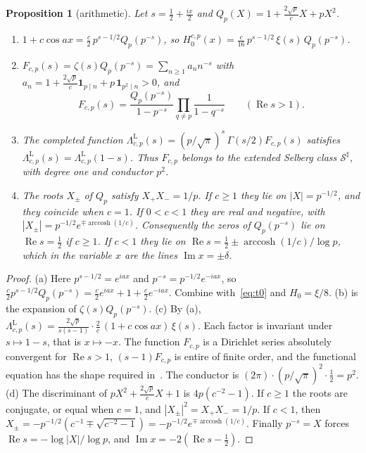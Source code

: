 \documentclass[11pt]{article}
\numberwithin{equation}{section}
\newtheorem{proposition}[theorem]{Proposition}
\theoremstyle{definition}
\theoremstyle{remark}
\DeclareMathOperator{\Rea}{Re}
\DeclareMathOperator{\Ima}{Im}
\DeclareMathOperator{\arccosh}{arccosh}
\newcommand{\Sh}{\mathcal S^\sharp}
\begin{document}
\begin{proposition}[arithmetic]\label{prop:arith}
Let $s=\tfrac12+\tfrac{ix}2$ and $Q_p(X)=1+\tfrac{2\sqrt p}{c}X+pX^2$.
\begin{enumerate}[label=\textup{(\alph*)}]
\item $1+c\cos ax=\tfrac c2\,p^{s-1/2}Q_p(p^{-s})$, so
$H^{c,p}_0(x)=\tfrac c{16}\,p^{s-1/2}\,\xi(s)\,Q_p(p^{-s})$.
\item $F_{c,p}(s)=\zeta(s)Q_p(p^{-s})=\sum_{n\ge1}a_nn^{-s}$ with
$a_n=1+\tfrac{2\sqrt p}c\mathbf 1_{p\mid n}+p\,\mathbf 1_{p^2\mid n}>0$,
and
\[
F_{c,p}(s)=\frac{Q_p(p^{-s})}{1-p^{-s}}\prod_{q\ne p}\frac1{1-q^{-s}}
\qquad(\Rea s>1).
\]
\item The completed function $\Lambda_{c,p}^{\mathrm{L}}(s)=(p/\sqrt\pi)^s\,
\Gamma(s/2)F_{c,p}(s)$ satisfies
$\Lambda^{\mathrm L}_{c,p}(s)=\Lambda^{\mathrm L}_{c,p}(1-s)$. Thus
$F_{c,p}$ belongs to the extended Selberg class $\Sh$, with degree one and
conductor $p^2$.
\item The roots $X_\pm$ of $Q_p$ satisfy $X_+X_-=1/p$. If $c\ge1$ they lie on
$|X|=p^{-1/2}$, and they coincide when $c=1$. If $0<c<1$ they are real and
negative, with $|X_\pm|=p^{-1/2}e^{\mp\arccosh(1/c)}$. Consequently the zeros
of $Q_p(p^{-s})$ lie on $\Rea s=\tfrac12$ if $c\ge1$. If $c<1$ they lie on
$\Rea s=\tfrac12\pm\arccosh(1/c)/\log p$, which in the variable $x$ are the
lines $\Ima x=\pm\delta$.
\end{enumerate}
\end{proposition}

\begin{proof}
(a) Here $p^{s-1/2}=e^{iax}$ and $p^{-s}=p^{-1/2}e^{-iax}$, so
$\tfrac c2p^{s-1/2}Q_p(p^{-s})=\tfrac c2e^{iax}+1+\tfrac c2e^{-iax}$.
Combine with~\eqref{eq:t0} and $H_0=\xi/8$.
(b) is the expansion of $\zeta(s)Q_p(p^{-s})$.
(c) By (a), $\Lambda^{\mathrm L}_{c,p}(s)
=\frac{2\sqrt p}{s(s-1)}\cdot\frac2c\,(1+c\cos ax)\,\xi(s)$. Each factor is
invariant under $s\mapsto1-s$, that is $x\mapsto-x$. The function $F_{c,p}$
is a Dirichlet series absolutely convergent for $\Rea s>1$, $(s-1)F_{c,p}$
is entire of finite order, and the functional equation has the shape required
in~\cite{dobner}. The conductor is $(2\pi)\cdot(p/\sqrt\pi)^2\cdot\tfrac12
=p^2$.
(d) The discriminant of $pX^2+\tfrac{2\sqrt p}cX+1$ is $4p(c^{-2}-1)$. If
$c\ge1$ the roots are conjugate, or equal when $c=1$, and $|X_\pm|^2=X_+X_-=1/p$.
If $c<1$, then $X_\pm=-p^{-1/2}(c^{-1}\mp\sqrt{c^{-2}-1})
=-p^{-1/2}e^{\mp\arccosh(1/c)}$. Finally $p^{-s}=X$ forces
$\Rea s=-\log|X|/\log p$, and $\Ima x=-2(\Rea s-\tfrac12)$.
\end{proof}
\end{document}
